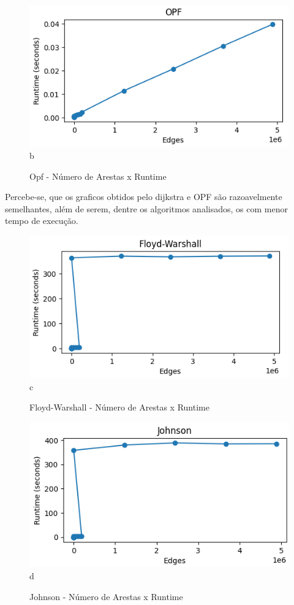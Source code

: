 \documentclass[12pt]{article}
\begin{document}
\begin{figure}[H]
    \centering
        \includegraphics[scale=1]{opf.png}{b}
        \caption{Opf - Número de Arestas x Runtime}
\end{figure}
Percebe-se, que os graficos obtidos pelo dijkstra e OPF são razoavelmente semelhantes, além de serem, dentre os algoritmos analisados, os com menor tempo de execução.
\begin{figure}[H]
    \centering
        \includegraphics[scale=1]{floyd.png}{c}
        \caption{Floyd-Warshall - Número de Arestas x Runtime}
\end{figure}

\begin{figure}[H]
    \centering
        \includegraphics[scale=1]{john.png}{d}
        \caption{Johnson - Número de Arestas x Runtime}
\end{figure}
\end{document}
